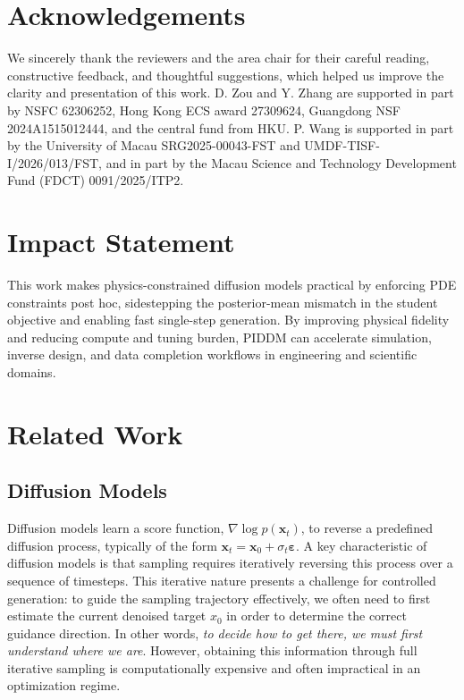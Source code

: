 \documentclass{article}
\theoremstyle{plain}
\theoremstyle{definition}
\theoremstyle{remark}
\def\vx{{\bm{x}}}
\begin{document}
\section*{Acknowledgements}
We sincerely thank the reviewers and the area chair for their careful reading, constructive feedback, and thoughtful suggestions, which helped us improve the clarity and presentation of this work.  D. Zou and Y. Zhang are supported in part by NSFC 62306252, Hong Kong ECS award 27309624, Guangdong NSF
2024A1515012444, and the central fund from HKU. P. Wang is supported in part by the University of Macau SRG2025-00043-FST and UMDF-TISF-I/2026/013/FST, and in part by the Macau Science and Technology Development Fund (FDCT) 0091/2025/ITP2.

\section*{Impact Statement}
This work makes physics-constrained diffusion models practical by enforcing PDE constraints post hoc, sidestepping the posterior-mean mismatch in the student objective and enabling fast single-step generation. By improving physical fidelity and reducing compute and tuning burden, PIDDM can accelerate simulation, inverse design, and data completion workflows in engineering and scientific domains.



\newpage
\appendix

\onecolumn
\section{Related Work}
\subsection{Diffusion Models}
Diffusion models \cite{song2020score, ho2020ddpm, karras2022edm} learn a score function, $\nabla \log p(\vx_t)$, to reverse a predefined diffusion process, typically of the form $\vx_t = \vx_0 + \sigma_t \boldsymbol{\varepsilon}$. A key characteristic of diffusion models is that sampling requires iteratively reversing this process over a sequence of timesteps. This iterative nature presents a challenge for controlled generation: to guide the sampling trajectory effectively, we often need to first estimate the current denoised target $x_0$ in order to determine the correct guidance direction. In other words, \textit{to decide how to get there, we must first understand where we are}. However, obtaining this information through full iterative sampling is computationally expensive and often impractical in an optimization regime.
\end{document}
